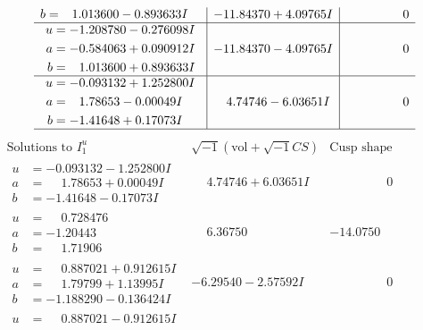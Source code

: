 \documentclass[1p]{elsarticle_modified}
\theoremstyle{definition}
\newcommand{\I}{\sqrt{-1}}
\begin{document}
$$\begin{array}{c|c|c}
\begin{aligned}
b &= \phantom{-}1.013600 - 0.893633 I\end{aligned}
 & -11.84370 + 4.09765 I & \phantom{-0.000000 } 0 \\ \hline\begin{aligned}
u &= -1.208780 - 0.276098 I \\
a &= -0.584063 + 0.090912 I \\
b &= \phantom{-}1.013600 + 0.893633 I\end{aligned}
 & -11.84370 - 4.09765 I & \phantom{-0.000000 } 0 \\ \hline\begin{aligned}
u &= -0.093132 + 1.252800 I \\
a &= \phantom{-}1.78653 - 0.00049 I \\
b &= -1.41648 + 0.17073 I\end{aligned}
 & \phantom{-}4.74746 - 6.03651 I & \phantom{-0.000000 } 0\\
 \hline 
 \end{array}$$\newpage$$\begin{array}{c|c|c}  
\text{Solutions to }I^u_{1}& \I (\text{vol} + \sqrt{-1}CS) & \text{Cusp shape}\\
 \hline 
\begin{aligned}
u &= -0.093132 - 1.252800 I \\
a &= \phantom{-}1.78653 + 0.00049 I \\
b &= -1.41648 - 0.17073 I\end{aligned}
 & \phantom{-}4.74746 + 6.03651 I & \phantom{-0.000000 } 0 \\ \hline\begin{aligned}
u &= \phantom{-}0.728476\phantom{ +0.000000I} \\
a &= -1.20443\phantom{ +0.000000I} \\
b &= \phantom{-}1.71906\phantom{ +0.000000I}\end{aligned}
 & \phantom{-}6.36750\phantom{ +0.000000I} & -14.0750\phantom{ +0.000000I} \\ \hline\begin{aligned}
u &= \phantom{-}0.887021 + 0.912615 I \\
a &= \phantom{-}1.79799 + 1.13995 I \\
b &= -1.188290 - 0.136424 I\end{aligned}
 & -6.29540 - 2.57592 I & \phantom{-0.000000 } 0 \\ \hline\begin{aligned}
u &= \phantom{-}0.887021 - 0.912615 I \\

\end{aligned}
\end{array}$$
\end{document}
